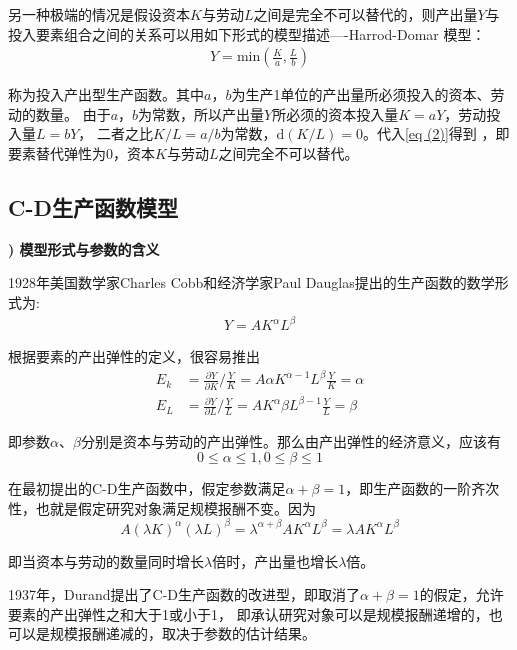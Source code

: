 	另一种极端的情况是假设资本$ K $与劳动$ L $之间是完全不可以替代的，则产出量$ Y $与投入要素组合之间的关系可以用如下形式的模型描述----Harrod-Domar 模型：
	\begin{align}
		Y = \text{min}\left ( \frac{K}{a},\frac{L}{b} \right ) \label{eq (5)}
	\end{align}

	称为投入产出型生产函数。其中$ a $，$ b $为生产1单位的产出量所必须投入的资本、劳动的数量。
	由于$ a $，$ b $为常数，所以产出量$ Y $所必须的资本投入量$ K=aY $，劳动投入量$ L=bY $，
	二者之比$ K/L=a/b $为常数，$ \mathrm{d}(K/L)=0 $。代入\eqref{eq (2)}得到 ，即要素替代弹性为0，资本$ K $与劳动$ L $之间完全不可以替代。
	
	\subsection{C-D生产函数模型}
		
	{\bf {}) 模型形式与参数的含义}
		
	1928年美国数学家Charles Cobb和经济学家Paul Dauglas提出的生产函数的数学形式为:
	\begin{align}
		Y = AK^{\alpha }L^{\beta } \label{eq (6)}
	\end{align}

	根据要素的产出弹性的定义，很容易推出
	\begin{align*}
		E_{k} & = \frac{\partial Y}{\partial K} / \frac{Y}{K}  = A \alpha K^{\alpha-1} L^{\beta} \frac{Y}{K}  = \alpha \\
		E_{L} & = \frac{\partial Y}{\partial L} / \frac{Y}{L}  = A K^{\alpha} \beta L^{\beta-1} \frac{Y}{L}  = \beta
	\end{align*}
		
	即参数$ \alpha $、$ \beta $分别是资本与劳动的产出弹性。那么由产出弹性的经济意义，应该有
	$$ 0\le \alpha \le 1,0\le \beta \le 1 $$
		
	在最初提出的C-D生产函数中，假定参数满足$ \alpha + \beta = 1 $，即生产函数的一阶齐次性，也就是假定研究对象满足规模报酬不变。因为 
	$$ A\left ( \lambda K \right ) ^{\alpha }\left ( \lambda L \right ) ^{\beta }=\lambda ^{\alpha +\beta }
	AK^{\alpha }L^{\beta }=\lambda AK^{\alpha }L^{\beta } $$
		
	即当资本与劳动的数量同时增长$ \lambda $倍时，产出量也增长$ \lambda $倍。	
		
	1937年，Durand提出了C-D生产函数的改进型，即取消了$ \alpha + \beta = 1 $的假定，允许要素的产出弹性之和大于1或小于1，
	即承认研究对象可以是规模报酬递增的，也可以是规模报酬递减的，取决于参数的估计结果。
		
